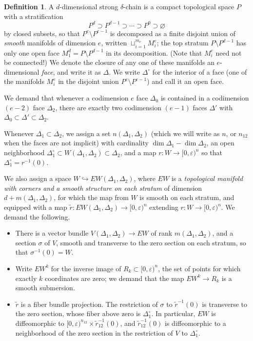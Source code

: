 \documentclass[10pt,a4paper]{amsart}
\theoremstyle{definition}
\newtheorem{definition}[theorem]{Definition}
\theoremstyle{remark}
\numberwithin{figure}{qchap}
\begin{document}
\begin{definition}A $d$-dimensional strong $\delta$-chain is a compact topological space $P$ with a stratification $$P^d \supset P^{d-1} \supset \cdots \supset P^0 \supset \varnothing$$ by closed subsets, so that $P^e \setminus P^{e-1}$ is decomposed as a finite disjoint union of \emph{smooth} manifolds of dimension $e$, written $\sqcup_{i=1}^{m_e} M_i^e$; the top stratum $P \setminus P^{d-1}$ has only one open face $M_1^d = P \setminus P^{d-1}$ in its decomposition. (Note that $M_i^e$ need not be connected!) We denote the closure of any one of these manifolds an $e$-dimensional \emph{face}, and write it as $\Delta$. We write $\Delta^\circ$ for the interior of a face (one of the manifolds $M_i^e$ in the disjoint union $P^e \setminus P^{e-1}$) and call it an \textup{open face}.

We demand that whenever a codimension $e$ face $\Delta_0$ is contained in a codimension $(e-2)$ face $\Delta_2$, there are exactly two codimension $(e-1)$ faces $\Delta'$ with $\Delta_0 \subset \Delta' \subset \Delta_2.$

Whenever $\Delta_1 \subset \Delta_2$, we assign a set $n(\Delta_1, \Delta_2)$ (which we will write as $n$, or $n_{12}$ when the faces are not implicit) with cardinality $\dim \Delta_1 - \dim \Delta_2$, an open neighborhood $\Delta_1^\circ \subset W(\Delta_1, \Delta_2) \subset \Delta_2$, and a map $r: W \to [0,\varepsilon)^n$ so that $\Delta_1^\circ = r^{-1}(0)$.

We also assign a space $W \hookrightarrow EW(\Delta_1, \Delta_2)$, where $EW$ is a \emph{topological manifold with corners and a smooth structure on each stratum} of dimension $d+m(\Delta_1, \Delta_2)$, for which the map from $W$ is smooth on each stratum, and equipped with a map $\tilde r: EW(\Delta_1, \Delta_2) \to [0,\varepsilon)^n$ extending $r: W \to [0,\varepsilon)^n$. We demand the following.
\begin{itemize}
\item There is a vector bundle $V(\Delta_1, \Delta_2) \to EW$ of rank $m(\Delta_1, \Delta_2)$, and a section $\sigma$ of $V$, smooth and transverse to the zero section on each stratum, so that $\sigma^{-1}(0) = W$.
\item Write $EW^k$ for the inverse image of $R_k \subset [0,\varepsilon)^n$, the set of points for which exactly $k$ coordinates are zero; we demand that the map $EW^k \to R_k$ is a smooth submersion.
\item $\tilde r$ is a fiber bundle projection. The restriction of $\sigma$ to $\tilde r^{-1}(0)$ is transverse to the zero section, whose fiber above zero is $\Delta_1^\circ$. In particular, $EW$ is diffeomorphic to $[0,\varepsilon)^{n_{12}} \times \tilde r_{12}^{-1}(0)$, and $\tilde r_{12}^{-1}(0)$ is diffeomorphic to a neighborhood of the zero section in the restriction of $V$ to $\Delta_1^\circ$.
\end{itemize}


\end{definition}
\end{document}
